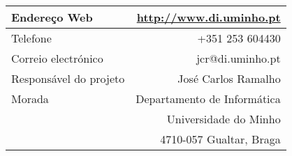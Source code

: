 \begin{center}
\begin{tabular}{l|r}
Endereço Web                 & \url{http://www.di.uminho.pt} \\\hline
Telefone                            & +351 253 604430 \\\hline
Correio electrónico          & jcr@di.uminho.pt \\\hline
Responsável do projeto       & José Carlos Ramalho \\\hline
Morada                       & Departamento de Informática\\
                             & Universidade do Minho\\
                             & 4710-057 Gualtar, Braga\\\hline                         
\end{tabular}
\end{center}